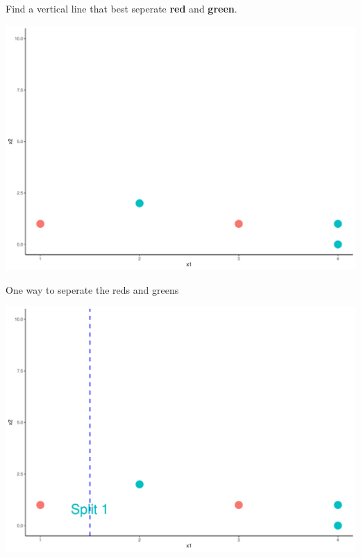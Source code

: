 \documentclass[
  ignorenonframetext,
]{beamer}
\begin{document}
\begin{frame}{Find a vertical line that best seperate \textbf{red} and
\textbf{green}.}
\protect\hypertarget{find-a-vertical-line-that-best-seperate-red-and-green.}{}

\includegraphics{fa_classification_tree2_files/figure-beamer/unnamed-chunk-1-1.pdf}

\end{frame}

\begin{frame}{One way to seperate the reds and greens}
\protect\hypertarget{one-way-to-seperate-the-reds-and-greens}{}

\includegraphics{fa_classification_tree2_files/figure-beamer/unnamed-chunk-2-1.pdf}

\end{frame}
\end{document}
